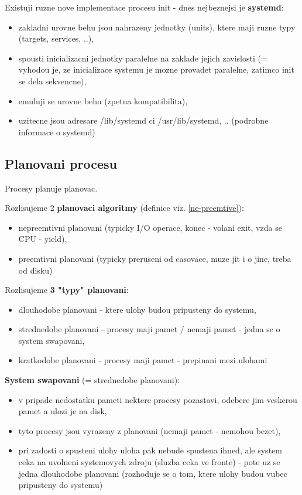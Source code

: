\documentclass[a4paper, 11pt]{article}
\begin{document}
Existuji ruzne nove implementace procesu init - dnes nejbeznejsi je \textbf{systemd}:
\begin{itemize}
    \item zakladni urovne behu jsou nahrazeny jednotky (units), ktere maji ruzne typy (targets, services, ..),
    \item spousti inicializacni jednotky paralelne na zaklade jejich zavislosti (= vyhodou je, ze inicializace systemu je mozne provadet paralelne, zatimco init se dela sekvencne),
    \item emuluji se urovne behu (zpetna kompatibilita),
    \item uzitecne jsou adresare /lib/systemd ci /usr/lib/systemd, .. (podrobne informace o systemd) \\ 
\end{itemize}

\newpage

\subsection{Planovani procesu} \label{planovani}
Procesy planuje planovac.

Rozlisujeme 2 \textbf{planovaci algoritmy} (definice viz. \ref{ne-preemtive}):
\begin{itemize}
    \item nepreemtivni planovani (typicky I/O operace, konec - volani exit, vzda se CPU - yield),
    \item preemtivni planovani (typicky preruseni od casovace, muze jit i o jine, treba od disku) \\
\end{itemize}

Rozlisujeme \textbf{3 "typy" planovani}:
\begin{itemize}
    \item dlouhodobe planovani - ktere ulohy budou pripusteny do systemu,
    \item strednedobe planovani - procesy maji pamet / nemaji pamet - jedna se o system swapovani,
    \item kratkodobe planovani - procesy maji pamet - prepinani mezi ulohami \\
\end{itemize}

\textbf{System swapovani} (= strednedobe planovani):
\begin{itemize}
    \item v pripade nedostatku pameti nektere procesy pozastavi, odebere jim veskerou pamet a ulozi je na disk,
    \item tyto procesy jsou vyrazeny z planovani (nemaji pamet - nemohou bezet),
    \item pri zadosti o spusteni ulohy uloha pak nebude spustena ihned, ale system ceka na uvolneni systemovych zdroju (sluzba ceka ve fronte) - pote uz se jedna dlouhodobe planovani (rozhoduje se o tom, ktere ulohy budou vubec pripusteny do systemu) \\
\end{itemize}
\end{document}
